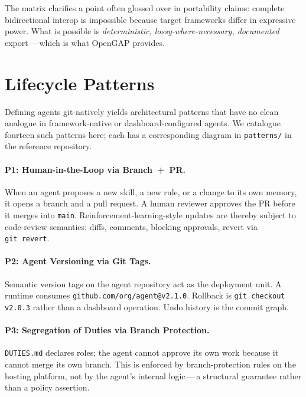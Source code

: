 \documentclass[11pt,a4paper]{article}
\begin{document}
The matrix clarifies a point often glossed over in portability claims: complete
bidirectional interop is impossible because target frameworks differ in expressive
power. What is possible is \emph{deterministic, lossy-where-necessary, documented}
export\,---\,which is what OpenGAP provides.

\section{Lifecycle Patterns}\label{sec:patterns}

Defining agents git-natively yields architectural patterns that have no clean analogue
in framework-native or dashboard-configured agents. We catalogue fourteen such patterns
here; each has a corresponding diagram in \texttt{patterns/} in the reference
repository.

\paragraph{P1: Human-in-the-Loop via Branch~+~PR.}
When an agent proposes a new skill, a new rule, or a change to its own memory, it
opens a branch and a pull request. A human reviewer approves the PR before it merges
into \texttt{main}. Reinforcement-learning-style updates are thereby subject to
code-review semantics: diffs, comments, blocking approvals, revert via
\texttt{git~revert}.

\paragraph{P2: Agent Versioning via Git Tags.}
Semantic version tags on the agent repository act as the deployment unit. A runtime
consumes \texttt{github.com/org/agent@v2.1.0}. Rollback is \texttt{git checkout v2.0.3}
rather than a dashboard operation. Undo history is the commit graph.

\paragraph{P3: Segregation of Duties via Branch Protection.}
\texttt{DUTIES.md} declares roles; the agent cannot approve its own work because it
cannot merge its own branch. This is enforced by branch-protection rules on the hosting
platform, not by the agent's internal logic\,---\,a structural guarantee rather than a
policy assertion.
\end{document}
